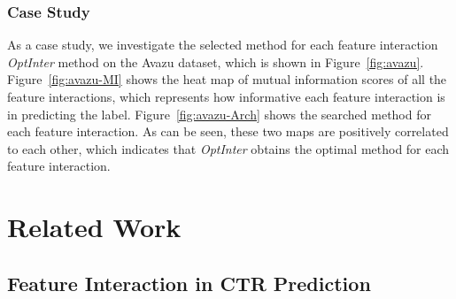 \documentclass[conference]{IEEEtran}
\begin{document}
\subsubsection{Case Study}
\label{sec:case_study}

\begin{figure*}[!htbp]
\centering
{}
\caption{An example of interpretability on Avazu Dataset. }
\label{fig:avazu} 
\end{figure*}

As a case study, we investigate the selected method for each feature interaction \textit{OptInter} method on the Avazu dataset, which is shown in Figure~\ref{fig:avazu}.  Figure~\ref{fig:avazu-MI} shows the heat map of mutual information scores of all the feature interactions, which represents how informative each feature interaction is in predicting the label. Figure~\ref{fig:avazu-Arch} shows the searched method for each feature interaction. As can be seen, these two maps are positively correlated to each other, which indicates that \textit{OptInter} obtains the optimal method for each feature interaction.

 \section{Related Work}
\label{sec:rw}

\subsection{Feature Interaction in CTR Prediction}
\end{document}
